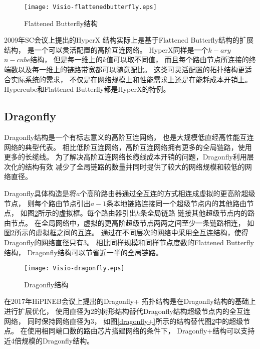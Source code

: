 \begin{figure}[htp]
  \centering
    \texttt{[image: Visio-flattenedbutterfly.eps]}
    \caption{Flattened Butterfly结构}
    \label{flattenedbutterfly}
\end{figure}

2009年SC会议上提出的HyperX
结构实际上是基于Flattened Butterfly结构的扩展结构，
是一个可以灵活配置的高阶互连网络。
HyperX同样是一个$k-ary$ $n-cube$结构，
但是每一维上的$k$值可以取不同值，
而且每个路由节点所连接的终端数以及每一维上的链路带宽都可以随意配比。
这类可灵活配置的拓扑结构更适合实际系统的需求，
不仅是在网络规模上和性能需求上还是在能耗成本开销上。
Hypercube和Flattened Butterfly都是HyperX的特例。

\subsection{Dragonfly}

Dragonfly结构是一个有标志意义的高阶互连网络，
也是大规模低直经高性能互连网络的典型代表。
相比低阶互连网络，高阶互连网络拥有更多的全局链路，使用更多的长缆线。
为了解决高阶互连网络长缆线成本开销的问题，Dragonfly利用层次化的结构有效
减少了全局链路的数量并同时提供了较大的网络规模和较低的网络直径。

Dragonfly具体构造是将$a$个高阶路由器通过全互连的方式相连成虚拟的更高阶超级节点，
则每个路由节点引出$a-1$条本地链路连接同一个超级节点内的其他路由节点，
如图\ref{dragonfly}所示的虚拟框。每个路由器引出$h$条全局链路
链接其他超级节点内的路由节点。
在全局网络中，虚拟的更高阶超级节点两两之间至少一条链路相连，
如图\ref{dragonfly}所示的虚拟框之间的互连。
通过在不同层次的网络中采用全互连结构，使得Dragonfly的网络直径只有3。
相比同样规模和同样节点度数的Flattened Butterfly结构，
Dragonfly结构可以节省近一半的全局链路。

\begin{figure}[htp]
  \centering
    \texttt{[image: Visio-dragonfly.eps]}
    \caption{Dragonfly结构}
       \label{dragonfly}
\end{figure}

在2017年HiPINEB会议上提出的Dragonfly+
拓扑结构是在Dragonfly结构的基础上进行扩展优化，
使用直径为2的树形结构替代Dragonfly结构超级节点内的全互连网络，
同时保持网络直径为3，
如图\ref{dragonfly+}所示的结构替代图\ref{dragonfly}中的超级节点。
在使用相同端口数的路由芯片搭建网络的条件下，
Dragonfly+结构可以支持近4倍规模的Dragonfly结构。

